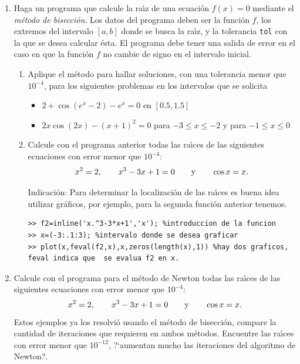 \documentclass[11pt]{article}
\begin{document}
\begin{enumerate}
\item Haga un programa que calcule la ra\'{\i}z de una ecuaci\'on 
$f(x)=0$ mediante el {\em m\'etodo de bisecci\'on}. Los datos del 
programa deben ser la funci\'on $f$, los extremos del intervalo $[a,b]$ 
donde se busca la ra\'{\i}z, y la tolerancia {\tt tol} con la que se 
desea calcular \'esta. 
El programa debe tener una salida de error en el caso en que la 
funci\'on $f$ no cambie de signo en el intervalo inicial. 
%
\begin{enumerate}
\item Aplique el m\'etodo para hallar soluciones, con una tolerancia menor que $10^{-4}$, para los siguientes problemas en los intervalos que se solicita
\begin{itemize}
\item $2+\cos(e^x-2)-e^x=0$ en $[0.5,1.5]$
\item $2x\cos(2x)-(x+1)^2=0$ para $-3\le x\le -2$ y para $-1\le x\le 0$
\end{itemize}
%
\item Calcule con el programa anterior todas las ra\'{\i}ces de las 
siguientes ecuaciones con error menor que $10^{-4}$:
$$
x^2=2,\qquad x^3-3x+1=0\qquad{\rm y}\qquad\cos x=x.
$$

Indicaci\'on: Para determinar la localizaci\'on de las ra{\'\i}ces es buena idea utilizar gr\'aficos, por ejemplo, para la segunda funci\'on anterior tenemos.
\begin{lstlisting}
>> f2=inline('x.^3-3*x+1','x'); %introduccion de la funcion
>> x=(-3:.1:3); %intervalo donde se desea graficar
>> plot(x,feval(f2,x),x,zeros(length(x),1)) %hay dos graficos, feval indica que  se evalua f2 en x.
\end{lstlisting}
\end{enumerate}


\item  Calcule con el programa para el m\'etodo de Newton todas las ra\'{\i}ces de las siguientes ecuaciones con error menor que $10^{-4}$:
$$
x^2=2,\qquad x^3-3x+1=0\qquad{\rm y}\qquad\cos x=x.
$$ Estos ejemplos ya los resolvi\'o usando el m\'etodo de bisecci\'on, compare la cantidad de iteraciones que requieren en ambos m\'etodos. Encuentre las ra{\'\i}ces  con error menor que $10^{-12}$, ?`aumentan mucho las iteraciones del algoritmo de Newton?.


\end{enumerate}
\end{document}
